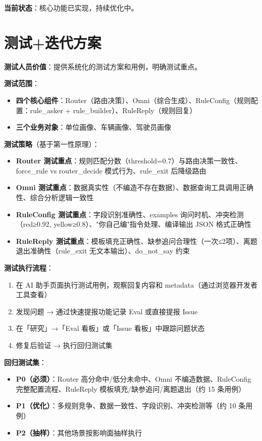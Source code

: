 \documentclass[UTF8]{ctexart}
\begin{document}
\textbf{当前状态}：核心功能已实现，持续优化中。

\section{测试+迭代方案}

\textbf{测试人员价值}：提供系统化的测试方案和用例，明确测试重点。

\textbf{测试范围}：
\begin{itemize}
    \item \textbf{四个核心组件}：Router（路由决策）、Omni（综合生成）、RuleConfig（规则配置：rule\_asker + rule\_builder）、RuleReply（规则回复）
    \item \textbf{三个业务对象}：单位画像、车辆画像、驾驶员画像
\end{itemize}

\textbf{测试策略}（基于第一性原理）：
\begin{itemize}
    \item \textbf{Router 测试重点}：规则匹配分数（threshold=0.7）与路由决策一致性、force\_rule vs router\_decide 模式行为、rule\_exit 后降级路由
    \item \textbf{Omni 测试重点}：数据真实性（不编造不存在数据）、数据查询工具调用正确性、综合分析逻辑一致性
    \item \textbf{RuleConfig 测试重点}：字段识别准确性、examples 询问时机、冲突检测（red≥0.92, yellow≥0.8）、"你自己编"指令处理、编译输出 JSON 格式正确性
    \item \textbf{RuleReply 测试重点}：模板填充正确性、缺参追问合理性（一次≤2项）、离题退出准确性（rule\_exit 无文本输出）、do\_not\_say 约束
\end{itemize}

\textbf{测试执行流程}：
\begin{enumerate}
    \item 在 AI 助手页面执行测试用例，观察回复内容和 metadata（通过浏览器开发者工具查看）
    \item 发现问题 → 通过快速提报功能记录 Eval 或直接提报 Issue
    \item 在「研究」→「Eval 看板」或「Issue 看板」中跟踪问题状态
    \item 修复后验证 → 执行回归测试集
\end{enumerate}

\textbf{回归测试集}：
\begin{itemize}
    \item \textbf{P0（必须）}：Router 高分命中/低分未命中、Omni 不编造数据、RuleConfig 完整配置流程、RuleReply 模板填充/缺参追问/离题退出（约 15 条用例）
    \item \textbf{P1（优化）}：多规则竞争、数据一致性、字段识别、冲突检测等（约 10 条用例）
    \item \textbf{P2（抽样）}：其他场景按影响面抽样执行
\end{itemize}
\end{document}
